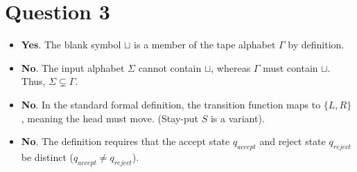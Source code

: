 \documentclass[a4paper, UTF-8]{article}
\theoremstyle{plain}
\begin{document}
\section{Question 3} 
\begin{itemize}
    \item [a.] \textbf{Yes}. The blank symbol $\sqcup$ is a member of the tape alphabet $\Gamma$ by definition.
    \item [b.] \textbf{No}. The input alphabet $\Sigma$ cannot contain $\sqcup$, whereas $\Gamma$ must contain $\sqcup$. Thus, $\Sigma \subsetneq \Gamma$.
    \item [c.] \textbf{No}. In the standard formal definition, the transition function maps to $\{L, R\}$, meaning the head must move. (Stay-put $S$ is a variant).
    \item [d.] \textbf{No}. The definition requires that the accept state $q_{accept}$ and reject state $q_{reject}$ be distinct ($q_{accept} \neq q_{reject}$).
\end{itemize}
\end{document}

